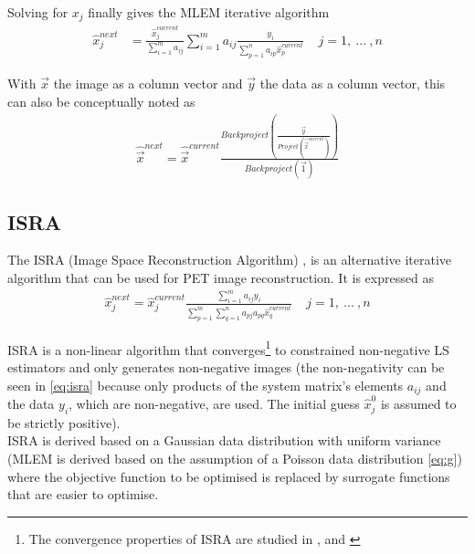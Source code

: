 \documentclass[report,12pt]{report}
\begin{document}
Solving for $x_j$ finally gives the MLEM iterative algorithm
\begin{align}
	\hat x_{j}^{next} &= \frac{\hat x_{j}^{current}}{\sum_{i=1}^{m}a_{ij}} \sum_{i=1}^{m}a_{ij}
	\frac{y_{i}}{\sum_{p=1}^{n}a_{ip}\hat x_{p}^{current}} \ \ \ \ \ j = 1,\ ...\ ,n
\end{align}

With $\vec{x}$ the image as a column vector and $\vec{y}$ the data as a column vector, this can also be conceptually noted as
\begin{align}
	\hat{\vec{x}}^{next} = \hat{\vec{x}}^{current} \frac{Backproject\left( \frac{\vec{y}}{Project\left( \hat{\vec{x}}^{current} \right)} \right)}{Backproject\left(\vec 1\right)}
	\label{eq:MLEMConceptually}
\end{align} 




\subsection{ISRA}\label{sec:isra}
The ISRA (Image Space Reconstruction Algorithm) \cite{daube-wither}, \cite{de pierro} is an alternative iterative algorithm that can be used for PET image reconstruction. It is expressed as
\begin{align}
	\hat x_j^{next} = \hat x_j^{current}\frac
	{\sum_{i=1}^{m} a_{ij}y_i}
	{\sum_{p=1}^{m} \sum_{q=1}^{n} a_{pj}a_{pq}\hat x_q^{current}}\ \ \ \ \ j = 1,\ ...\ ,n
	\label{eq:isra}
\end{align}

ISRA is a non-linear algorithm that converges\footnote{The convergence properties of ISRA are studied in \cite{de pierro 2}, \cite{eggermont} and \cite{titterington}} to constrained non-negative LS estimators and only generates non-negative images (the non-negativity can be seen in \ref{eq:isra} because only products of the system matrix's elements $a_{ij}$ and the data $y_i$, which are non-negative, are used. The initial guess $\hat x_j^0$ is assumed to be strictly positive).\\

ISRA is derived based on a Gaussian data distribution with uniform variance (MLEM is derived based on the assumption of a Poisson data distribution \ref{eq:g}) where the objective function to be optimised is replaced by surrogate functions that are easier to optimise.\\
\end{document}
